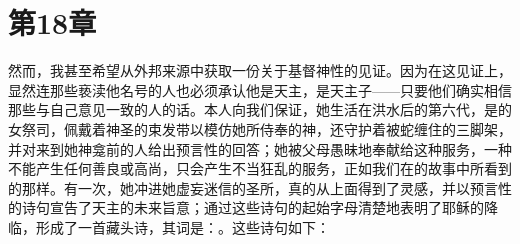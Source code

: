 
\section{第18章 }

然而，我甚至希望从外邦来源中获取一份关于基督神性的见证。因为在这见证上，显然连那些亵渎他名号的人也必须承认他是天主，是天主子——只要他们确实相信那些与自己意见一致的人的话。本人向我们保证，她生活在洪水后的第六代，是的女祭司，佩戴着神圣的束发带以模仿她所侍奉的神，还守护着被蛇缠住的三脚架，并对来到她神龛前的人给出预言性的回答；她被父母愚昧地奉献给这种服务，一种不能产生任何善良或高尚，只会产生不当狂乱的服务，正如我们在的故事中所看到的那样。有一次，她冲进她虚妄迷信的圣所，真的从上面得到了灵感，并以预言性的诗句宣告了天主的未来旨意；通过这些诗句的起始字母清楚地表明了耶稣的降临，形成了一首藏头诗，其词是：。这些诗句如下：\par

